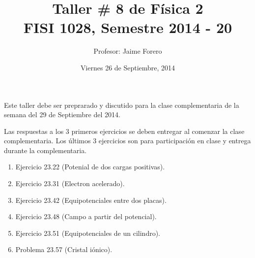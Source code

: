 \documentclass{article}
\title{Taller \# 8 de F\'isica 2\\ FISI 1028, Semestre 2014 - 20}
\author{Profesor: Jaime Forero}
\date{Viernes 26 de Septiembre, 2014}
\begin{document}
\maketitle
\thispagestyle{empty}

\noindent

Este taller debe ser preprarado y discutido para la clase
complementaria de la semana del 29 de Septiembre del 2014.


Las respuestas a los 3 primeros ejercicios se deben entregar al comenzar la
clase complementaria. Los \'ultimos 3 ejercicios son para
participaci\'on en clase y entrega durante la complementaria. 

\begin{enumerate}

\item
Ejercicio 23.22 (Potenial de dos cargas positivas).

\item 
Ejercicio 23.31 (Electron acelerado).

\item 
Ejercicio 23.42 (Equipotenciales entre dos placas).

\item
Ejercicio 23.48 (Campo a partir del potencial).

\item
Ejercicio 23.51 (Equipotenciales de un cilindro).

\item 
Problema 23.57 (Cristal i\'onico).

\end{enumerate}
\end{document}
